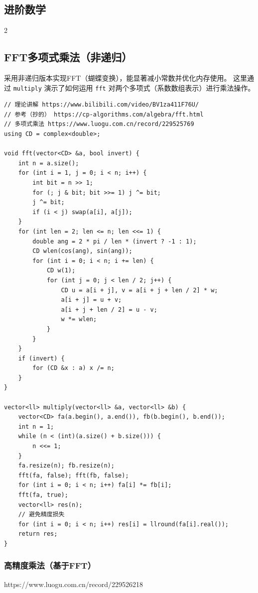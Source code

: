 	\begin{center}
		\section{进阶数学}
	\end{center}

	\begin{multicols*}{2} %

		\subsection{FFT多项式乘法（非递归）}

		采用非递归版本实现FFT（蝴蝶变换），能显著减小常数并优化内存使用。
		这里通过 \texttt{multiply} 演示了如何运用 \texttt{fft} 对两个多项式（系数数组表示）进行乘法操作。

		\begin{verbatim}
// 理论讲解 https://www.bilibili.com/video/BV1za411F76U/
// 参考（抄的） https://cp-algorithms.com/algebra/fft.html
// 多项式乘法 https://www.luogu.com.cn/record/229525769
using CD = complex<double>;

void fft(vector<CD> &a, bool invert) {
	int n = a.size();
	for (int i = 1, j = 0; i < n; i++) {
		int bit = n >> 1;
		for (; j & bit; bit >>= 1) j ^= bit;
		j ^= bit;
		if (i < j) swap(a[i], a[j]);
	}
	for (int len = 2; len <= n; len <<= 1) {
		double ang = 2 * pi / len * (invert ? -1 : 1);
		CD wlen(cos(ang), sin(ang));
		for (int i = 0; i < n; i += len) {
			CD w(1);
			for (int j = 0; j < len / 2; j++) {
				CD u = a[i + j], v = a[i + j + len / 2] * w;
				a[i + j] = u + v;
				a[i + j + len / 2] = u - v;
				w *= wlen;
			}
		}
	}
	if (invert) {
		for (CD &x : a) x /= n;
	}
}

vector<ll> multiply(vector<ll> &a, vector<ll> &b) {
	vector<CD> fa(a.begin(), a.end()), fb(b.begin(), b.end());
	int n = 1;
	while (n < (int)(a.size() + b.size())) {
		n <<= 1;
	}
	fa.resize(n); fb.resize(n);
	fft(fa, false); fft(fb, false);
	for (int i = 0; i < n; i++) fa[i] *= fb[i];
	fft(fa, true);
	vector<ll> res(n);
	// 避免精度损失
	for (int i = 0; i < n; i++) res[i] = llround(fa[i].real());
	return res;
}
		\end{verbatim}

		\subsubsection{高精度乘法（基于FFT）}

		https://www.luogu.com.cn/record/229526218


\end{multicols*}
